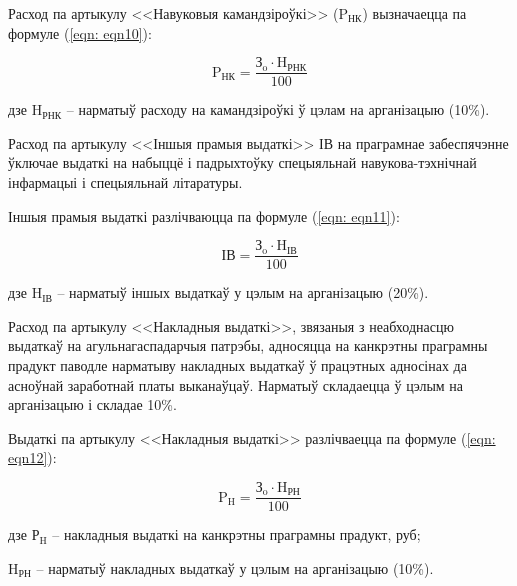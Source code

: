 Расход па артыкулу <<Навуковыя камандзіроўкі>> ($\text{P}_\text{НК}$) вызначаецца па формуле (\ref{eqn: eqn10}):

\begin{equation}
    \label{eqn: eqn10}
    \text{P}_\text{НК} = \frac{\text{З}_\text{o} \cdot \text{H}_\text{РНК}}{100}
\end{equation}
\begin{Explanation}
    \item[дзе] $\text{H}_\text{РНК}$ -- нарматыў расходу на камандзіроўкі ў цэлам на арганізацыю (10\%).
\end{Explanation}

Расход па артыкулу <<Іншыя прамыя выдаткі>> $\text{ІВ}$ на праграмнае забеспячэнне ўключае выдаткі на набыццё і падрыхтоўку спецыяльнай навукова-тэхнічнай інфармацыі і спецыяльнай літаратуры.

Іншыя прамыя выдаткі разлічваюцца па формуле (\ref{eqn: eqn11}):

\begin{equation}
    \label{eqn: eqn11}
    \text{ІВ} = \frac{\text{З}_\text{o} \cdot \text{H}_\text{ІВ}}{100}
\end{equation}
\begin{Explanation}
    \item[дзе] $\text{H}_\text{ІВ}$ -- нарматыў іншых выдаткаў у цэлым на арганізацыю (20\%).
\end{Explanation}

Расход па артыкулу <<Накладныя выдаткі>>, звязаныя з неабходнасцю
выдаткаў на агульнагаспадарчыя патрэбы, адносяцца на канкрэтны праграмны прадукт
паводле нарматыву накладных выдаткаў ў працэтных адносінах да асноўнай заработнай платы выканаўцаў. Нарматыў складаецца ў цэлым на арганізацыю і складае 10\%.

Выдаткі па артыкулу <<Накладныя выдаткі>> разлічваецца па формуле (\ref{eqn: eqn12}):

\begin{equation}
    \label{eqn: eqn12}
    \text{P}_\text{H} = \frac{\text{З}_\text{o} \cdot \text{H}_\text{РН}}{100}
\end{equation}
\begin{Explanation}
    \item[дзе] $\text{Р}_\text{H}$ -- накладныя выдаткі на канкрэтны праграмны прадукт, руб;
    \item $\text{H}_\text{РН}$ -- нарматыў накладных выдаткаў у цэлым на арганізацыю (10\%).
\end{Explanation}

